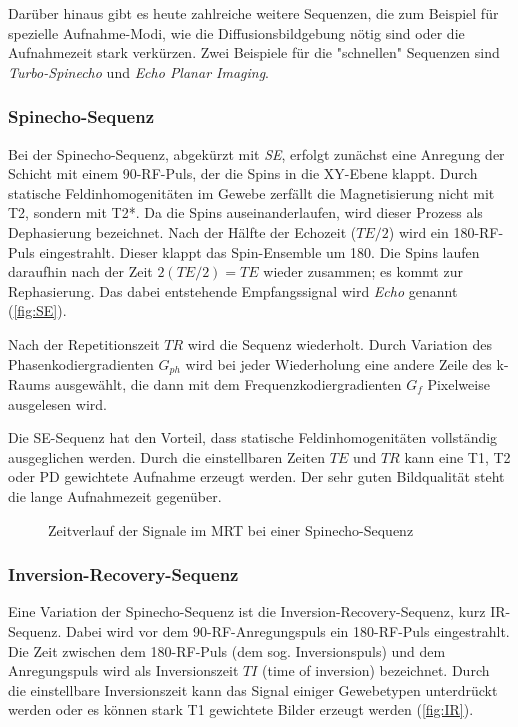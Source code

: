 Darüber hinaus gibt es heute zahlreiche weitere Sequenzen, die zum Beispiel für spezielle Aufnahme-Modi, wie die Diffusionsbildgebung nötig sind oder die Aufnahmezeit stark verkürzen. Zwei Beispiele für die "schnellen" Sequenzen sind \textit{Turbo-Spinecho} und \textit{Echo Planar Imaging}.


\subsubsection{Spinecho-Sequenz}
Bei der Spinecho-Sequenz, abgekürzt mit \textit{SE}, erfolgt zunächst eine Anregung der Schicht mit einem 90\degree-RF-Puls, der die Spins in die XY-Ebene klappt. Durch statische Feldinhomogenitäten im Gewebe zerfällt die Magnetisierung nicht mit T2, sondern mit T2*. Da die Spins auseinanderlaufen, wird dieser Prozess als Dephasierung bezeichnet. Nach der Hälfte der Echozeit ($TE/2$) wird ein 180\degree-RF-Puls eingestrahlt. Dieser klappt das Spin-Ensemble um 180\degree. Die Spins laufen daraufhin nach der Zeit $2(TE/2) = TE$ wieder zusammen; es kommt zur Rephasierung. Das dabei entstehende Empfangssignal wird \textit{Echo} genannt (\autoref{fig:SE}).

Nach der Repetitionszeit $TR$ wird die Sequenz wiederholt. Durch Variation des Phasenkodiergradienten $G_{ph}$ wird bei jeder Wiederholung eine andere Zeile des k-Raums ausgewählt, die dann mit dem Frequenzkodiergradienten $G_f$ Pixelweise ausgelesen wird.

Die SE-Sequenz hat den Vorteil, dass statische Feldinhomogenitäten vollständig ausgeglichen werden. Durch die einstellbaren Zeiten $TE$ und $TR$ kann eine T1, T2 oder PD gewichtete Aufnahme erzeugt werden.
Der sehr guten Bildqualität steht die lange Aufnahmezeit gegenüber.

\begin{figure}[H]
	\centering
	\caption[Spinecho-Sequenz]{Zeitverlauf der Signale im MRT bei einer Spinecho-Sequenz}
	\label{fig:SE}
\end{figure}

\subsubsection{Inversion-Recovery-Sequenz}
Eine Variation der Spinecho-Sequenz ist die Inversion-Recovery-Sequenz, kurz IR-Sequenz. Dabei wird vor dem 90\degree-RF-Anregungspuls ein 180\degree-RF-Puls eingestrahlt. Die Zeit zwischen dem 180\degree-RF-Puls (dem sog. Inversionspuls) und dem Anregungspuls wird als Inversionszeit $TI$ (time of inversion) bezeichnet. Durch die einstellbare Inversionszeit kann das Signal einiger Gewebetypen unterdrückt werden oder es können stark T1 gewichtete Bilder erzeugt werden (\autoref{fig:IR}).

